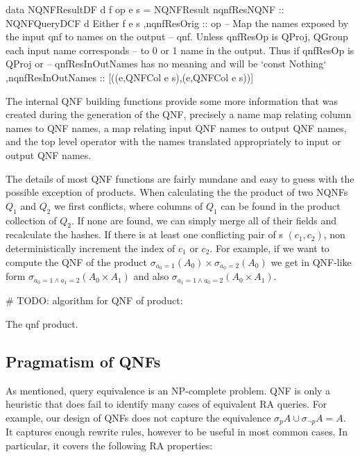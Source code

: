 \begin{code}
  \begin{haskellcode}
    data NQNFResultDF d f op e s =
    NQNFResult
    { nqnfResNQNF :: NQNFQueryDCF d Either f e s
      ,nqnfResOrig :: op
      -- Map the names exposed by the input qnf to names on the output
      -- qnf. Unless qnfResOp is QProj, QGroup each input name corresponds
      -- to 0 or 1 name in the output. Thus if qnfResOp is QProj or
      -- qnfResInOutNames has no meaning and will be `const Nothing`
      ,nqnfResInOutNames :: [((e,QNFCol e s),(e,QNFCol e s))]
    }
  \end{haskellcode}
  \caption{\label{lst:qnf_result}The internal QNF building functions
    provide some more information that was created during the
    generation of the QNF, precisely a name map relating column names
    to QNF names, a map relating input QNF names to output QNF names,
    and the top level operator with the names translated appropriately
    to input or output QNF names.}
\end{code}

The details of most QNF functions are fairly mundane and easy to guess
with the possible exception of products. When calculating the
the product of two NQNFs \(Q_1\) and \(Q_2\) we first conflicts,
where columns of \(Q_1\) can be found in the product collection of
\(Q_2\). If none are found, we can simply merge all of their fields and recalculate the hashes.
If there is at least one conflicting pair of s \((c_1,c_2)\), non deterministically
increment the index of \(c_1\) or \(c_2\). For example, if we want to compute the QNF of the product
\(\sigma_{a_0=1}(A_0) \times \sigma_{a_0=2}(A_0)\) we get in QNF-like
form \(\sigma_{a_0=1 \land a_1=2} (A_0 \times A_1)\) and also
\(\sigma_{a_1=1 \land a_0=2} (A_0 \times A_1)\).

\begin{code}
  \begin{pycode}
    # TODO: algorithm for QNF of product:
  \end{pycode}
  \label{lst:qnf_product}
  \caption{The qnf product.}
\end{code}

\subsection{Pragmatism of QNFs}

As mentioned, query equivalence is an NP-complete problem. QNF is only a heuristic
that does fail to identify many cases of equivalent RA queries.
For example, our design of QNFs does not capture the equivalence
\(\sigma_p A \cup \sigma_{\neg p} A = A\). It captures enough rewrite rules, however to be 
useful in most common cases. In particular, it covers the following RA properties:

